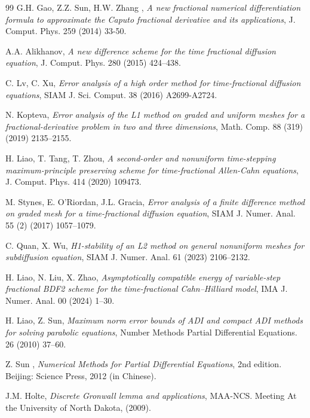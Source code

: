 \documentclass{siamart171218}
\theoremstyle{remark}
\theoremstyle{example}
\numberwithin{equation}{section}
\begin{document}
\begin{thebibliography}{99}
{\sc G.H. Gao, Z.Z. Sun, H.W. Zhang }, \emph{A new fractional numerical differentiation formula to approximate the Caputo fractional derivative and its applications}, J. Comput. Phys. 259 (2014) 33-50.

{\sc A.A. Alikhanov}, \emph{A new difference scheme for the time fractional diffusion equation}, J. Comput. Phys. 280 (2015) 424–438.

{\sc C. Lv, C. Xu}, \emph{Error analysis of a high order method for time-fractional diffusion equations},  SIAM J. Sci. Comput. 38 (2016) A2699-A2724.

{\sc N. Kopteva}, {\em Error analysis of the L1 method on graded and uniform meshes for a fractional-derivative problem in two and three dimensions}, Math. Comp. 88 (319) (2019) 2135–2155.

{\sc  H. Liao, T. Tang, T. Zhou}, {\em  A second-order and nonuniform time-stepping maximum-principle preserving scheme for time-fractional Allen-Cahn equations}, J. Comput. Phys. 414 (2020) 109473.

{\sc M. Stynes, E. O’Riordan, J.L. Gracia}, \emph{Error analysis of a finite difference
method on graded mesh for a time-fractional diffusion equation}, SIAM J. Numer. Anal. 55 (2) (2017) 1057–1079.

{\sc C. Quan, X. Wu}, \emph{H1-stability of an L2 method on general nonuniform meshes for subdiffusion equation}, SIAM J. Numer. Anal. 61 (2023) 2106–2132.

{\sc H. Liao, N. Liu, X. Zhao}, {\em Asymptotically compatible energy of variable-step fractional BDF2 scheme for the time-fractional Cahn–Hilliard model}, IMA J. Numer. Anal. 00 (2024) 1–30.

{\sc H. Liao, Z. Sun}, \emph{Maximum norm error bounds of ADI and compact ADI methods for solving	parabolic equations}, Number Methods Partial Differential Equations. 26 (2010) 37–60.

{\sc Z. Sun }, \emph{Numerical Methods for Partial Differential Equations}, 2nd edition. Beijing: Science Press, 2012 (in Chinese).

{\sc J.M. Holte}, {\em Discrete Gronwall lemma and applications}, MAA-NCS. Meeting At the University of North Dakota, (2009).




\end{thebibliography}
\end{document}
